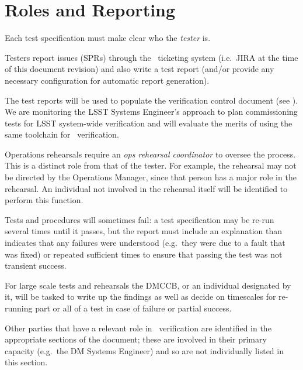 

\section{Roles and Reporting}

Each test specification must make clear who the \emph{tester} is.

Testers report issues (SPRs) through the \product\ ticketing system (i.e.\ JIRA at the time of this document revision) and also write a test report (and/or provide any necessary configuration for automatic report generation).

The test reports will be used to populate the verification control document (see ). We are monitoring the LSST Systems Engineer's approach to plan commissioning tests for LSST system-wide verification and will evaluate the merits of using the same toolchain for \product\ verification.

Operations rehearsals require an \emph{ops rehearsal coordinator} to oversee the process. This is a distinct role from that of the tester. For example, the rehearsal may not be directed by the Operations Manager, since that person has a major role in the rehearsal. An individual not involved in the rehearsal itself will be identified to perform this function.

Tests and procedures will sometimes fail: a test specification may be re-run several times until it passes, but the report must include an explanation than indicates that any failures were understood (e.g.\ they were due to a fault that was fixed) or repeated sufficient times to ensure that passing the test was not transient success.

For large scale tests and rehearsals the DMCCB, or an individual designated by it, will be tasked to write up the findings as well as decide on timescales for re-running part or all of a test in case of failure or partial success.

Other parties that have a relevant role in \product\ verification are identified in the appropriate sections of the document; these are involved in their primary capacity (e.g.\ the DM Systems Engineer) and so are not individually listed in this section.
